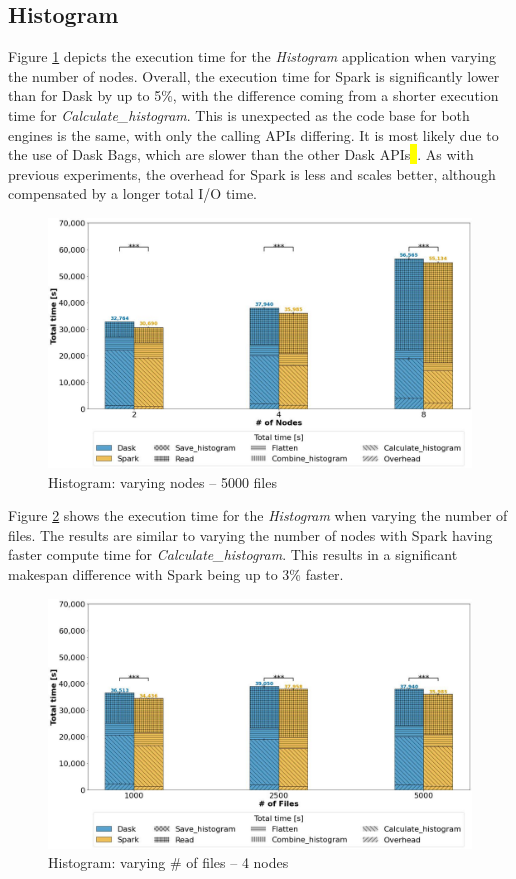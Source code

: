 \documentclass[AMA,STIX1COL]{WileyNJD-v2}
\newcommand{\HL}[1]{\hl{#1}}
\begin{document}
\subsection{Histogram}
Figure \ref{fig:histogram_worker} depicts the execution time for the \textit{Histogram} application when varying the number of nodes.
Overall, the execution time for Spark is significantly lower than for Dask by up to 5\%, with the difference coming from a shorter execution time for \textit{Calculate\_histogram}.
This is unexpected as the code base for both engines is the same, with only the calling APIs differing.
It is most likely due to the use of Dask Bags, which are slower than the other Dask APIs\HL{~{\cite{DaskBagDoc}}}.
As with previous experiments, the overhead for Spark is less and scales better, although compensated by a longer total I/O time.
\begin{figure}[!h]
	\centering
	\includegraphics[clip,width=0.75\columnwidth]{figures/stacked_histogram_worker.jpg}
	\caption{Histogram: varying nodes -- 5000 files}
	\label{fig:histogram_worker}
\end{figure}
															
Figure \ref{fig:histogram_block} shows the execution time for the \textit{Histogram} when varying the number of files.
The results are similar to varying the number of nodes with Spark having faster compute time for \textit{Calculate\_histogram}.
This results in a significant makespan difference with Spark being up to 3\% faster.
\begin{figure}[!h]
	\centering
	\includegraphics[clip,width=0.75\columnwidth]{figures/stacked_histogram_block.jpg}
	\caption{Histogram: varying \# of files -- 4 nodes}
	\label{fig:histogram_block}
\end{figure}
													
\end{document}
